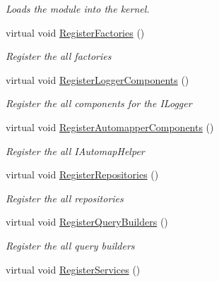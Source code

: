 \begin{DoxyCompactItemize}
\begin{DoxyCompactList}\small\item\em Loads the module into the kernel. \end{DoxyCompactList}\item 
virtual void \hyperlink{classCqrs_1_1Ninject_1_1Configuration_1_1CqrsModule_afae0f84460f7cf9d1f9b62ec148b02ad_afae0f84460f7cf9d1f9b62ec148b02ad}{Register\+Factories} ()
\begin{DoxyCompactList}\small\item\em Register the all factories \end{DoxyCompactList}\item 
virtual void \hyperlink{classCqrs_1_1Ninject_1_1Configuration_1_1CqrsModule_a7bb448b4c38d7a4628a30ba709dc8a36_a7bb448b4c38d7a4628a30ba709dc8a36}{Register\+Logger\+Components} ()
\begin{DoxyCompactList}\small\item\em Register the all components for the I\+Logger \end{DoxyCompactList}\item 
virtual void \hyperlink{classCqrs_1_1Ninject_1_1Configuration_1_1CqrsModule_a5c3b6741270b2cb16aa1a1a84c57041b_a5c3b6741270b2cb16aa1a1a84c57041b}{Register\+Automapper\+Components} ()
\begin{DoxyCompactList}\small\item\em Register the all I\+Automap\+Helper \end{DoxyCompactList}\item 
virtual void \hyperlink{classCqrs_1_1Ninject_1_1Configuration_1_1CqrsModule_a3437afb1ea306ff4e65eb2ca22a276d9_a3437afb1ea306ff4e65eb2ca22a276d9}{Register\+Repositories} ()
\begin{DoxyCompactList}\small\item\em Register the all repositories \end{DoxyCompactList}\item 
virtual void \hyperlink{classCqrs_1_1Ninject_1_1Configuration_1_1CqrsModule_afc0f6417f69d5424fe7bba7a6724970f_afc0f6417f69d5424fe7bba7a6724970f}{Register\+Query\+Builders} ()
\begin{DoxyCompactList}\small\item\em Register the all query builders \end{DoxyCompactList}\item 
virtual void \hyperlink{classCqrs_1_1Ninject_1_1Configuration_1_1CqrsModule_ac6f0db82440e24190a5692d352fb4524_ac6f0db82440e24190a5692d352fb4524}{Register\+Services} ()

\end{DoxyCompactItemize}
